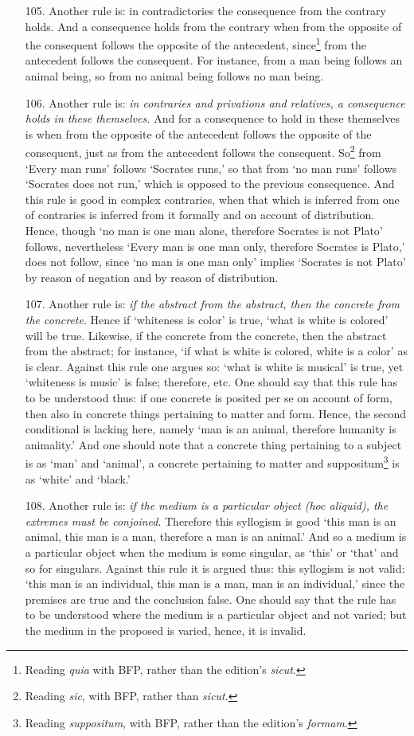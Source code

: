 \documentclass[]{article}
\begin{document}
\begin{itemize}
\item[105.] Another rule is: in contradictories the consequence from the contrary holds. And a consequence holds from the contrary when from the opposite of the consequent follows the opposite of the antecedent, since\footnote{Reading \textit{quia} with BFP, rather than the edition's \textit{sicut}.} from the antecedent follows the consequent. For instance, from a man being follows an animal being, so from no animal being follows no man being.
\item[106.] Another rule is: \textit{in contraries and privations and relatives, a consequence holds in these themselves.} And for a consequence to hold in these themselves is when from the opposite of the antecedent follows the opposite of the consequent, just as from the antecedent follows the consequent. So\footnote{Reading \textit{sic}, with BFP, rather than \textit{sicut}.} from `Every man runs' follows `Socrates runs,' so that from `no man runs' follows `Socrates does not run,' which is opposed to the previous consequence. And this rule is good in complex contraries, when that which is inferred from one of contraries is inferred from it formally and on account of distribution. Hence, though `no man is one man alone, therefore Socrates is not Plato' follows, nevertheless `Every man is one man only, therefore Socrates is Plato,' does not follow, since `no man is one man only' implies `Socrates is not Plato' by reason of negation and by reason of distribution.
\item[107.] Another rule is: \textit{if the abstract from the abstract, then the concrete from the concrete}. Hence if `whiteness is color' is true, `what is white is colored' will be true. Likewise, if the concrete from the concrete, then the abstract from the abstract; for instance, `if what is white is colored, white is a color' as is clear. Against this rule one argues so: `what is white is musical' is true, yet `whiteness is music' is false; therefore, etc. One should say that this rule has to be understood thus: if one concrete is posited per se on account of form, then also in concrete things pertaining to matter and form. Hence, the second conditional is lacking here, namely `man is an animal, therefore humanity is animality.' And one should note that a concrete thing pertaining to a subject is as `man' and `animal', a concrete pertaining to matter and suppositum\footnote{Reading \textit{suppositum}, with BFP, rather than the edition's \textit{formam}.} is as `white' and `black.'
\item[108.] Another rule is: \textit{if the medium is a particular object (hoc aliquid), the extremes must be conjoined}. Therefore this syllogism is good `this man is an animal, this man is a man, therefore a man is an animal.' And so a medium is a particular object when the medium is some singular, as `this' or `that' and so for singulars. Against this rule it is argued thus: this syllogism is not valid: `this man is an individual, this man is a man, man is an individual,' since the premises are true and the conclusion false. One should say that the rule has to be understood where the medium is a particular object and not varied; but the medium in the proposed is varied, hence, it is invalid.

\end{itemize}
\end{document}
